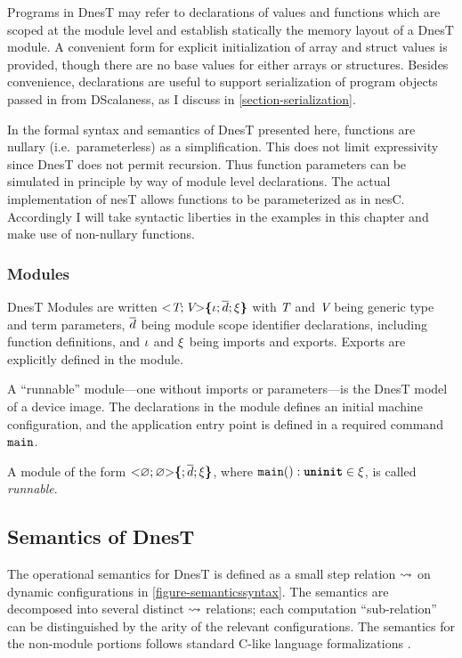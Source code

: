 Programs in DnesT may refer to declarations of values and functions which are scoped at the
module level and establish statically the memory layout of a DnesT module. A convenient form for
explicit initialization of array and struct values is provided, though there are no base values
for either arrays or structures. Besides convenience, declarations are useful to support
serialization of program objects passed in from DScalaness, as I discuss in
\autoref{section-serialization}.

In the formal syntax and semantics of DnesT presented here, functions are nullary
(i.e.~parameterless) as a simplification. This does not limit expressivity since DnesT does not
permit recursion. Thus function parameters can be simulated in principle by way of module level
declarations. The actual implementation of nesT allows functions to be parameterized as in nesC.
Accordingly I will take syntactic liberties in the examples in this chapter and make use of
non-nullary functions.

\subsubsection{Modules}

DnesT Modules are written $\margs{\tpdecl; \vpdecl}\lc \imports; \decls \exports \rc$ with
$\tpdecl$ and $\vpdecl$ being generic type and term parameters, $\vect{d}$ being module scope
identifier declarations, including function definitions, and $\imports$ and $\exports$ being
imports and exports. Exports are explicitly defined in the module.

A ``runnable'' module---one without imports or parameters---is the DnesT model of a device
image. The declarations in the module defines an initial machine configuration, and the
application entry point is defined in a required command $\tt{main}$.
\begin{definition}
\label{definition-runnable}
A module of the form $\margs{\varnothing; \varnothing }\lc ; \vect{\decl}; \exports\rc$, where
$\tt{main}() : \undefv \in \exports$, is called \emph{runnable}.
\end{definition}

\subsection{Semantics of DnesT} 
\label{section-nestsemantics}

The operational semantics for DnesT is defined as a small step relation $\compute$ on dynamic
configurations in \autoref{figure-semanticssyntax}. The semantics are decomposed into several
distinct $\compute$ relations; each computation ``sub-relation'' can be distinguished by the
arity of the relevant configurations. The semantics for the non-module portions follows standard
C-like language formalizations \cite{Leroy-compcert-06,grossman03}.

